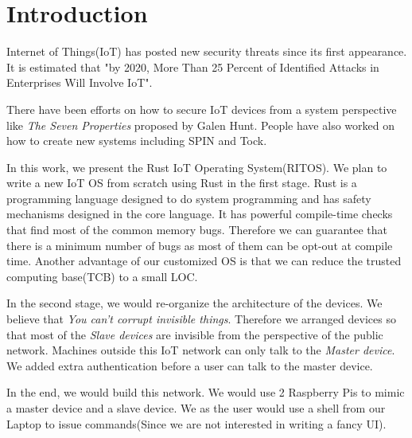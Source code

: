 \section{Introduction}


Internet of Things(IoT) has posted new security threats since its first appearance. 
It is estimated that "by 2020, More Than 25 Percent of Identified Attacks in Enterprises Will Involve IoT"\cite{gartner2016gartner}.


There have been efforts on how to secure IoT devices from a system perspective like \textit{The Seven Properties}\cite{hunt2017the} proposed by Galen Hunt.
People have also worked on how to create new systems including SPIN\cite{hesselman2017spin} and Tock\cite{levy2017tock}.



In this work, we present the Rust IoT Operating System(RITOS).
We plan to write a new IoT OS from scratch using Rust in the first stage.
Rust is a programming language designed to do system programming and has safety mechanisms designed in the core language.
It has powerful compile-time checks that find most of the common memory bugs.
Therefore we can guarantee that there is a minimum number of bugs as most of them can be opt-out at compile time. 
Another advantage of our customized OS is that we can reduce the trusted computing base(TCB) to a small LOC.

In the second stage, we would re-organize the architecture of the devices.
We believe that \textit{You can't corrupt invisible things}.
Therefore we arranged devices so that most of the \textit{Slave devices} are invisible from the perspective of the public network.
Machines outside this IoT network can only talk to the \textit{Master device}.
We added extra authentication before a user can talk to the master device.


In the end, we would build this network. 
We would use 2 Raspberry Pis to mimic a master device and a slave device. 
We as the user would use a shell from our Laptop to issue commands(Since we are not interested in writing a fancy UI).
